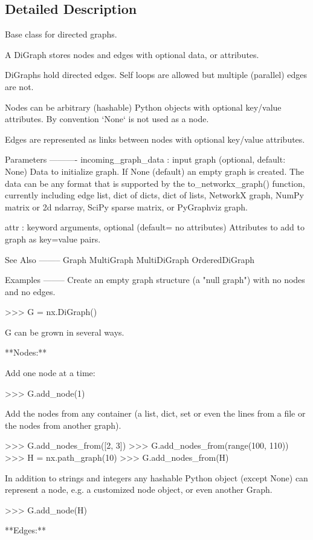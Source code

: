 \subsection{Detailed Description}
\begin{DoxyVerb}Base class for directed graphs.

A DiGraph stores nodes and edges with optional data, or attributes.

DiGraphs hold directed edges.  Self loops are allowed but multiple
(parallel) edges are not.

Nodes can be arbitrary (hashable) Python objects with optional
key/value attributes. By convention `None` is not used as a node.

Edges are represented as links between nodes with optional
key/value attributes.

Parameters
----------
incoming_graph_data : input graph (optional, default: None)
    Data to initialize graph. If None (default) an empty
    graph is created.  The data can be any format that is supported
    by the to_networkx_graph() function, currently including edge list,
    dict of dicts, dict of lists, NetworkX graph, NumPy matrix
    or 2d ndarray, SciPy sparse matrix, or PyGraphviz graph.

attr : keyword arguments, optional (default= no attributes)
    Attributes to add to graph as key=value pairs.

See Also
--------
Graph
MultiGraph
MultiDiGraph
OrderedDiGraph

Examples
--------
Create an empty graph structure (a "null graph") with no nodes and
no edges.

>>> G = nx.DiGraph()

G can be grown in several ways.

**Nodes:**

Add one node at a time:

>>> G.add_node(1)

Add the nodes from any container (a list, dict, set or
even the lines from a file or the nodes from another graph).

>>> G.add_nodes_from([2, 3])
>>> G.add_nodes_from(range(100, 110))
>>> H = nx.path_graph(10)
>>> G.add_nodes_from(H)

In addition to strings and integers any hashable Python object
(except None) can represent a node, e.g. a customized node object,
or even another Graph.

>>> G.add_node(H)

**Edges:**


\end{DoxyVerb}
